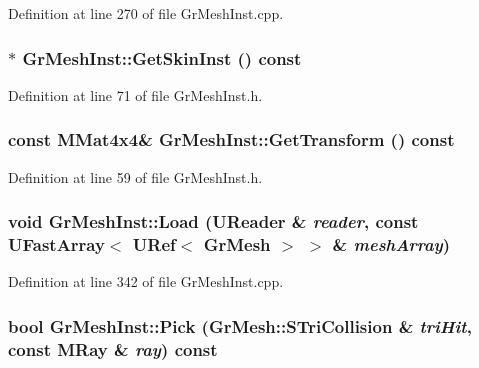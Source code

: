Definition at line 270 of file GrMeshInst.cpp.\hypertarget{class_gr_mesh_inst_08eab6fa5c82f0c5a0b1bbe86f4f6dac}{
\subsubsection[{GetSkinInst}]{$\ast$ GrMeshInst::GetSkinInst () const}}
\label{class_gr_mesh_inst_08eab6fa5c82f0c5a0b1bbe86f4f6dac}




Definition at line 71 of file GrMeshInst.h.\hypertarget{class_gr_mesh_inst_bc956297c8b4dc6cae1e16f04f949bf6}{
\subsubsection[{GetTransform}]{\setlength{\rightskip}{0pt plus 5cm}const {\bf MMat4x4}\& GrMeshInst::GetTransform () const}}
\label{class_gr_mesh_inst_bc956297c8b4dc6cae1e16f04f949bf6}




Definition at line 59 of file GrMeshInst.h.\hypertarget{class_gr_mesh_inst_4f5bd87c312707f1c3b4f04f30eeb06a}{
\subsubsection[{Load}]{\setlength{\rightskip}{0pt plus 5cm}void GrMeshInst::Load ({\bf UReader} \& {\em reader}, \/  const {\bf UFastArray}$<$ {\bf URef}$<$ {\bf GrMesh} $>$ $>$ \& {\em meshArray})}}
\label{class_gr_mesh_inst_4f5bd87c312707f1c3b4f04f30eeb06a}




Definition at line 342 of file GrMeshInst.cpp.\hypertarget{class_gr_mesh_inst_35ce724ce4bdf76802f3f3a846b499f8}{
\subsubsection[{Pick}]{\setlength{\rightskip}{0pt plus 5cm}bool GrMeshInst::Pick ({\bf GrMesh::STriCollision} \& {\em triHit}, \/  const {\bf MRay} \& {\em ray}) const}}
\label{class_gr_mesh_inst_35ce724ce4bdf76802f3f3a846b499f8}




